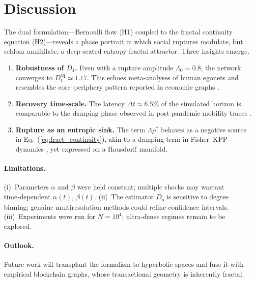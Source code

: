 \section{Discussion}\label{sec:discussion}

The dual formulation—Bernoulli flow (H1) coupled to the fractal
continuity equation (H2)—reveals a phase portrait in which social
ruptures modulate, but seldom annihilate, a deep‑seated
entropy‑fractal attractor.  Three insights emerge.

\begin{enumerate}
\item \textbf{Robustness of $D_1$.}  Even with a rupture amplitude
      $\Lambda_0 = 0.8$, the network converges to
      $D_1^{\text{eq}} \simeq 1.17$.  This echoes meta‑analyses of human
      egonets \citep{zhou2005discrete} and resembles the
      core–periphery pattern reported in economic graphs
      \citep{borgatti2000models}.
\item \textbf{Recovery time‑scale.}  The latency
      $\Delta t \approx 6.5\%$ of the simulated horizon is comparable
      to the damping phase observed in post‑pandemic mobility traces
      \citep{gao2022collective}.
\item \textbf{Rupture as an entropic sink.}  The term
      $\Lambda \rho^\ast$ behaves as a negative source in
      Eq.~(\ref{eq:fract_continuity}), akin to a damping term in
      Fisher–KPP dynamics \citep{murray2002mathematical}, yet expressed
      on a Hausdorff manifold.
\end{enumerate}

\paragraph{Limitations.}
(i) Parameters $\alpha$ and $\beta$ were held constant; multiple shocks
may warrant time‑dependent $\alpha(t)$, $\beta(t)$.
(ii) The estimator $D_q$ is sensitive to degree binning; genuine
multiresolution methods \citep{mandelbrot1983fractal} could refine
confidence intervals.
(iii) Experiments were run for $N = 10^4$; ultra‑dense regimes remain to
be explored.

\paragraph{Outlook.}
Future work will transplant the formalism to hyperbolic spaces
\citep{krioukov2010hyperbolic} and fuse it with empirical blockchain
graphs, whose transactional geometry is inherently fractal.

